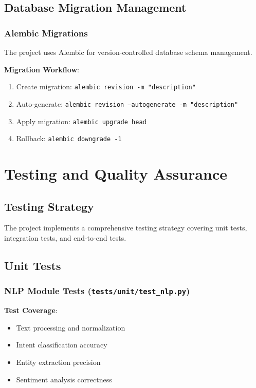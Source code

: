 \documentclass[12pt,a4paper]{article}
\begin{document}
\subsection{Database Migration Management}

\subsubsection{Alembic Migrations}

The project uses Alembic for version-controlled database schema management.

\textbf{Migration Workflow}:
\begin{enumerate}[leftmargin=*]
    \item Create migration: \texttt{alembic revision -m "description"}
    \item Auto-generate: \texttt{alembic revision --autogenerate -m "description"}
    \item Apply migration: \texttt{alembic upgrade head}
    \item Rollback: \texttt{alembic downgrade -1}
\end{enumerate}

\section{Testing and Quality Assurance}

\subsection{Testing Strategy}

The project implements a comprehensive testing strategy covering unit tests, integration tests, and end-to-end tests.

\subsection{Unit Tests}

\subsubsection{NLP Module Tests (\texttt{tests/unit/test\_nlp.py})}

\textbf{Test Coverage}:
\begin{itemize}[leftmargin=*]
    \item Text processing and normalization
    \item Intent classification accuracy
    \item Entity extraction precision
    \item Sentiment analysis correctness
\end{itemize}
\end{document}
